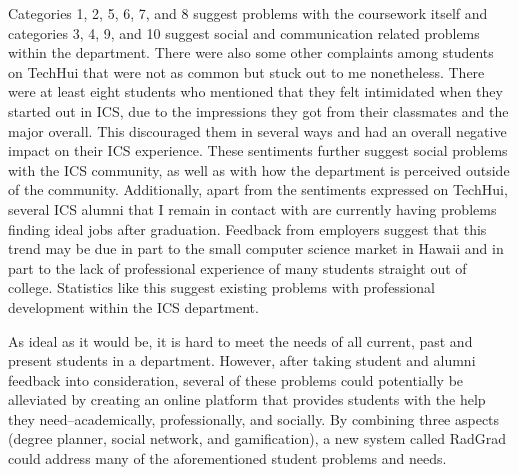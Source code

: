 Categories 1, 2, 5, 6, 7, and 8 suggest problems with the coursework itself and categories 3, 4, 9, and 10 suggest social and communication related problems within the department. There were also some other complaints among students on TechHui that were not as common but stuck out to me nonetheless. There were at least eight students who mentioned that they felt intimidated when they started out in ICS, due to the impressions they got from their classmates and the major overall. This discouraged them in several ways and had an overall negative impact on their ICS experience. These sentiments further suggest social problems with the ICS community, as well as with how the department is perceived outside of the community. Additionally, apart from the sentiments expressed on TechHui, several ICS alumni that I remain in contact with are currently having problems finding ideal jobs after graduation. Feedback from employers suggest that this trend may be due in part to the small computer science market in Hawaii and in part to the lack of professional experience of many students straight out of college. Statistics like this suggest existing problems with professional development within the ICS department. 

As ideal as it would be, it is hard to meet the needs of all current, past and present students in a department. However, after taking student and alumni feedback into consideration, several of these problems could potentially be alleviated by creating an online platform that provides students with the help they need--academically, professionally, and socially. By combining three aspects (degree planner, social network, and gamification), a new system called RadGrad could address many of the aforementioned student problems and needs.  

